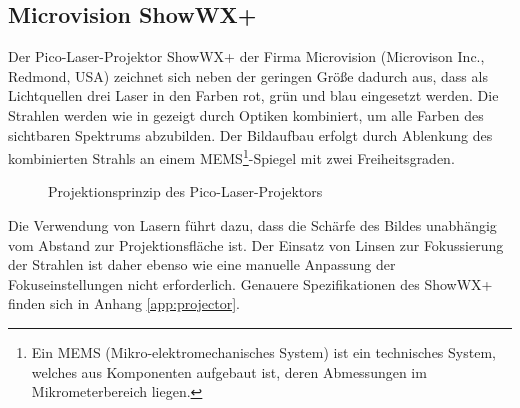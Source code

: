 

\prever{
}

\subsection{Microvision ShowWX+\textsuperscript{\texttrademark}}%
\label{chap.projector}
Der Pico-Laser-Projektor ShowWX+\textsuperscript{\texttrademark} der Firma Microvision (Microvison Inc., Redmond, USA) zeichnet sich neben der geringen Größe dadurch aus, dass als Lichtquellen drei Laser in den Farben rot, grün und blau eingesetzt werden. Die Strahlen werden wie in  gezeigt durch Optiken kombiniert, um alle Farben des sichtbaren Spektrums abzubilden. Der Bildaufbau erfolgt durch Ablenkung des kombinierten Strahls an einem MEMS\footnote{Ein MEMS (Mikro-elektromechanisches System) ist ein technisches System, welches aus Komponenten aufgebaut ist, deren Abmessungen im Mikrometerbereich liegen.}-Spiegel mit zwei Freiheitsgraden.


\begin{figure}[ht]
	\begin{center}
		\caption{Projektionsprinzip des Pico-Laser-Projektors}
		\label{fig.projtech}
	\end{center}
\end{figure}

\prever{
}

Die Verwendung von Lasern führt dazu, dass die Schärfe des Bildes unabhängig vom Abstand zur Projektionsfläche ist. Der Einsatz von Linsen zur Fokussierung der Strahlen ist daher ebenso wie eine manuelle Anpassung der Fokuseinstellungen nicht erforderlich. Genauere Spezifikationen des ShowWX+\textsuperscript{\texttrademark} finden sich in Anhang \ref{app:projector}.



